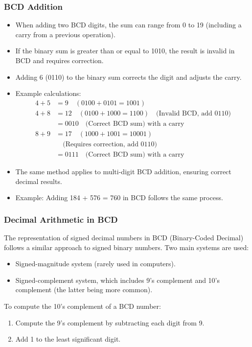 \documentclass[a4paper,12pt]{article}
\begin{document}
\subsubsection{BCD Addition}
\begin{itemize}
    \item When adding two BCD digits, the sum can range from 0 to 19 (including a carry from a previous operation).
    \item If the binary sum is greater than or equal to 1010, the result is invalid in BCD and requires correction.
    \item Adding 6 (0110) to the binary sum corrects the digit and adjusts the carry.
    \item Example calculations:
    \begin{align*}
        4 + 5 &= 9 \quad (0100 + 0101 = 1001)\\
        4 + 8 &= 12 \quad (0100 + 1000 = 1100) \quad \text{(Invalid BCD, add 0110)}\\
              &= 0010 \quad \text{(Correct BCD sum) with a carry}\\
        8 + 9 &= 17 \quad (1000 + 1001 = 10001)\\
              &\quad \text{(Requires correction, add 0110)}\\
              &= 0111 \quad \text{(Correct BCD sum) with a carry}
    \end{align*}
    \item The same method applies to multi-digit BCD addition, ensuring correct decimal results.
    \item Example: Adding 184 + 576 = 760 in BCD follows the same process.
\end{itemize}
\subsubsection{Decimal Arithmetic in BCD}
The representation of signed decimal numbers in BCD (Binary-Coded Decimal) follows a similar approach to signed binary numbers. Two main systems are used:

\begin{itemize}
    \item Signed-magnitude system (rarely used in computers).
    \item Signed-complement system, which includes 9's complement and 10's complement (the latter being more common).
\end{itemize}

To compute the 10's complement of a BCD number:
\begin{enumerate}
    \item Compute the 9’s complement by subtracting each digit from 9.
    \item Add 1 to the least significant digit.
\end{enumerate}
\end{document}
